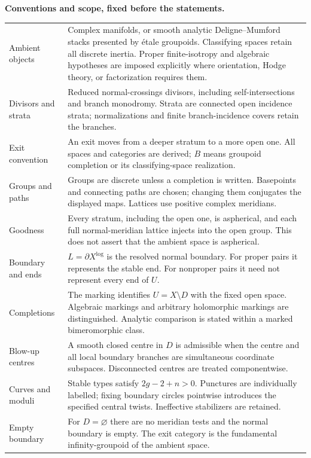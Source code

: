 \noindent\textbf{Conventions and scope, fixed before the statements.}
\begin{center}\small
\renewcommand{\arraystretch}{1.11}
\begin{tabularx}{\textwidth}{@{}p{}X@{}}
\toprule
Ambient objects&Complex manifolds, or smooth analytic Deligne--Mumford stacks presented by étale groupoids. Classifying spaces retain all discrete inertia. Proper finite-isotropy and algebraic hypotheses are imposed explicitly where orientation, Hodge theory, or factorization requires them.\\
Divisors and strata&Reduced normal-crossings divisors, including self-intersections and branch monodromy. Strata are connected open incidence strata; normalizations and finite branch-incidence covers retain the branches.\\
Exit convention&An exit moves from a deeper stratum to a more open one. All spaces and categories are derived; $B$ means groupoid completion or its classifying-space realization.\\
Groups and paths&Groups are discrete unless a completion is written. Basepoints and connecting paths are chosen; changing them conjugates the displayed maps. Lattices use positive complex meridians.\\
Goodness&Every stratum, including the open one, is aspherical, and each full normal-meridian lattice injects into the open group. This does not assert that the ambient space is aspherical.\\
Boundary and ends&$L=\partial X^{\log}$ is the resolved normal boundary. For proper pairs it represents the stable end. For nonproper pairs it need not represent every end of $U$.\\
Completions&The marking identifies $U=X\setminus D$ with the fixed open space. Algebraic markings and arbitrary holomorphic markings are distinguished. Analytic comparison is stated within a marked bimeromorphic class.\\
Blow-up centres&A smooth closed centre in $D$ is admissible when the centre and all local boundary branches are simultaneous coordinate subspaces. Disconnected centres are treated componentwise.\\
Curves and moduli&Stable types satisfy $2g-2+n>0$. Punctures are individually labelled; fixing boundary circles pointwise introduces the specified central twists. Ineffective stabilizers are retained.\\
Empty boundary&For $D=\varnothing$ there are no meridian tests and the normal boundary is empty. The exit category is the fundamental infinity-groupoid of the ambient space.\\

\end{tabularx}
\end{center}

